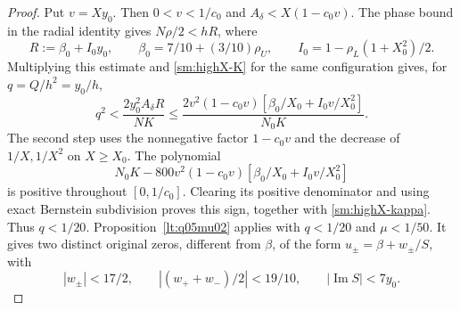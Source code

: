 \documentclass[11pt,reqno]{amsart}
\numberwithin{equation}{section}
\theoremstyle{definition}
\theoremstyle{remark}
\renewcommand{\Im}{\operatorname{Im}}
\begin{document}
\begin{proof}
Put $v=Xy_0$. Then $0<v<1/c_0$ and
$A_\delta<X(1-c_0v)$.
The phase bound in the radial identity gives
$N\rho/2<hR$, where
\[
 R:=\beta_0+I_0y_0,\qquad
 \beta_0=7/10+(3/10)\rho_U,\qquad
 I_0=1-\rho_L(1+X_0^2)/2.
\]
Multiplying this estimate and \eqref{sm:highX-K} for the same
configuration gives, for $q=Q/h^2=y_0/h$,
\begin{equation}\label{sm:highX-joint}
 q^2<\frac{2y_0^2A_\delta R}{NK}
 \le\frac{2v^2(1-c_0v)
            [\beta_0/X_0+I_0v/X_0^2]}{N_0K}.
\end{equation}
The second step uses the nonnegative factor $1-c_0v$ and
the decrease of $1/X,1/X^2$ on $X\ge X_0$.
The polynomial
\begin{equation}\label{sm:highX-q-polynomial}
 N_0K-800v^2(1-c_0v)
             [\beta_0/X_0+I_0v/X_0^2]
\end{equation}
is positive throughout $[0,1/c_0]$.
Clearing its positive denominator and using exact Bernstein
subdivision proves this sign, together with
\eqref{sm:highX-kappa}. Thus $q<1/20$.
Proposition~\ref{lt:q05mu02} applies with $q<1/20$ and $\mu<1/50$.
It gives two distinct original zeros, different
from $\beta$, of the form $u_\pm=\beta+w_\pm/S$, with
\begin{equation}\label{sm:highX-pair}
 |w_\pm|<17/2,\qquad
 |(w_++w_-)/2|<19/10,\qquad |\Im S|<7y_0.
\end{equation}


\end{proof}
\end{document}
